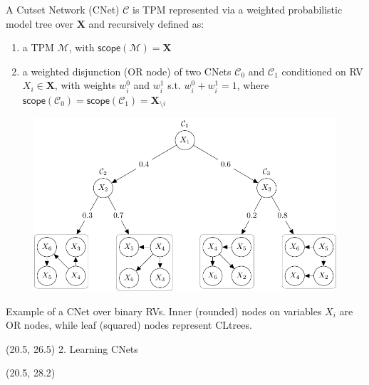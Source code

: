 \documentclass[final]{beamer}
\begin{document}
\begin{frame}{}
\begin{textblock}{17.5}
    A Cutset Network (CNet) $\mathcal{C}$ is TPM represented via a
    weighted probabilistic model tree over $\mathbf{X}$ and
    recursively defined as:
    \begin{enumerate}
    \item a TPM $\mathcal{M}$, with
      $\mathsf{scope}(\mathcal{M})=\mathbf X$
      \item a weighted  disjunction (OR node) of two CNets $\mathcal C_0$ and $\mathcal C_1$
     conditioned on RV $X_i \in \mathbf X$,  with
    weights $w_i^0$ and $w_i^1$ s.t. $w_i^0 + w_i^1 = 1$,
    where $\mathsf{scope}(\mathcal C_{0})=\mathsf{scope}(\mathcal C_{1})=\mathbf X_{\setminus i}$
    \end{enumerate}
    \begin{figure}
     \centering
     \includegraphics[width=15cm]{figures/csn}
  \label{fig:csn}
\end{figure}
\hspace{50pt}
\begin{minipage}{0.8\linewidth}
\scriptsize  Example of a CNet over binary RVs. Inner (rounded) nodes on
    variables $X_i$ are OR nodes, while leaf (squared) nodes represent CLtrees.
\end{minipage}

  \end{textblock}

  \begin{textblock}{17.5}(20.5, 26.5)
    2. Learning CNets
  \end{textblock}
  
  \begin{textblock}{17.5}(20.5, 28.2)
    \small
    

\end{textblock}
\end{frame}
\end{document}
